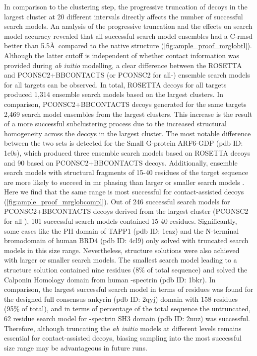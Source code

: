 In comparison to the clustering step, the progressive truncation of decoys in the largest cluster at 20 different intervals directly affects the number of successful search models. An analysis of the progressive truncation and the effects on search model accuracy revealed that all successful search model ensembles had a C\textalpha-\gls{rmsd} better than 5.5\AA\ compared to the native structure (\cref{fig:ample_proof_mrglobtl}). Although the latter cutoff is independent of whether contact information was provided during \textit{ab initio} modelling, a clear difference between the ROSETTA and PCONSC2+BBCONTACTS (or PCONSC2 for all-\textalpha) ensemble search models for all targets can be observed. In total, ROSETTA decoys for all targets produced 1,314 ensemble search models based on the largest clusters. In comparison, PCONSC2+BBCONTACTS decoys generated for the same targets 2,469 search model ensembles from the largest clusters. This increase is the result of a more successful subclustering process due to the increased structural homogeneity across the decoys in the largest cluster. The most notable difference between the two sets is detected for the Small G-protein ARF6-GDP (\gls{pdb} ID: 1e0s), which produced three ensemble search models based on ROSETTA decoys and 90 based on PCONSC2+BBCONTACTS decoys. Additionally, ensemble search models with structural fragments of 15-40 residues of the target sequence are more likely to succeed in \gls{mr} phasing than larger or smaller search models \cite{Bibby2012-lm}. Here we find that the same range is most successful for contact-assisted decoys (\cref{fig:ample_proof_mrglobcompl}). Out of 246 successful search models for PCONSC2+BBCONTACTS decoys derived from the largest cluster (PCONSC2 for all-\textalpha), 101 successful search models contained 15-40 residues. Significantly, some cases like the PH domain of TAPP1 (\gls{pdb} ID: 1eaz) and the N-terminal bromodomain of human BRD4 (\gls{pdb} ID: 4cl9) only solved with truncated search models in this size range. Nevertheless, structure solutions were also achieved with larger or smaller search models. The smallest search model leading to a structure solution contained nine residues (8\% of total sequence) and solved the Calponin Homology domain from human \textbeta-spectrin (\gls{pdb} ID: 1bkr). In comparison, the largest successful search model in terms of residues was found for the designed full consensus ankyrin (\gls{pdb} ID: 2qyj) domain with 158 residues (95\% of total), and in terms of percentage of the total sequence the untruncated, 62 residue search model for \textalpha-spectrin SH3 domain (\gls{pdb} ID: 2nuz) was successful. Therefore, although truncating the \textit{ab initio} models at different levels remains essential for contact-assisted decoys, biasing sampling into the most successful size range may be advantageous in future runs.


